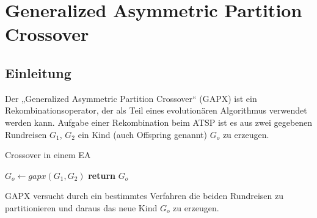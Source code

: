 \chapter{Generalized Asymmetric Partition Crossover}

\section{Einleitung}
Der „Generalized Asymmetric Partition Crossover“ (GAPX) ist ein
Rekombinationsoperator, der als Teil eines evolutionären Algorithmus
verwendet werden kann.\cite{gapx} Aufgabe einer Rekombination beim ATSP ist es aus
zwei gegebenen Rundreisen $G_1$, $G_2$ ein Kind (auch Offspring genannt)
$G_o$ zu erzeugen.


\begin{algorithm}
\caption{Crossover in einem EA}\label{alg:crossover_ea}
\begin{algorithmic}[1]
\Comment{}
\State $G_o\gets gapx(G_1,G_2)$
\State \textbf{return} $G_o$
\EndProcedure
\end{algorithmic}
\end{algorithm}
GAPX versucht durch ein bestimmtes Verfahren die beiden Rundreisen zu
partitionieren und daraus das neue Kind $G_o$ zu erzeugen.


